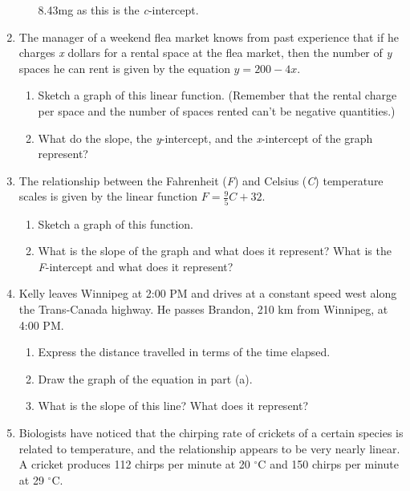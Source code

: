 \documentclass{article}
\begin{document}
\begin{enumerate}
\begin{enumerate}
				8.43mg as this is the \emph{c}-intercept.
			\end{enumerate}
			
		\item The manager of a weekend flea market knows from past experience that if he charges \emph{x} dollars
			for a rental space at the flea market, then the number of \emph{y} spaces he can rent is given by the
			equation $y = 200 - 4x$.
			
			\begin{enumerate}
				\item Sketch a graph of this linear function. (Remember that the rental charge per space and the
					number of spaces rented can't be negative quantities.)
					
				\item What do the slope, the \emph{y}-intercept, and the \emph{x}-intercept of the graph represent?
				
			\end{enumerate}
			
		\item The relationship between the Fahrenheit (\emph{F}) and Celsius (\emph{C}) temperature scales is given
			by the linear function $F = \frac{9}{5}C + 32$.
			
			\begin{enumerate}
				\item Sketch a graph of this function.
				
				\item What is the slope of the graph and what does it represent? What is the \emph{F}-intercept
					and what does it represent?
			\end{enumerate}
			
		\item Kelly leaves Winnipeg at 2:00 PM and drives at a constant speed west along the Trans-Canada highway. He
			passes Brandon, 210 km from Winnipeg, at 4:00 PM.
			
			\begin{enumerate}
				\item Express the distance travelled in terms of the time elapsed.
				
				\item Draw the graph of the equation in part (a).
				
				\item What is the slope of this line? What does it represent?
			\end{enumerate}
			
		\item Biologists have noticed that the chirping rate of crickets of a certain species is related to temperature,
			and the relationship appears to be very nearly linear. A cricket produces 112 chirps per minute at
			20 $^{\circ} \text{C}$ and 150 chirps per minute at 29 $^{\circ} \text{C}$.
			

\end{enumerate}
\end{document}
